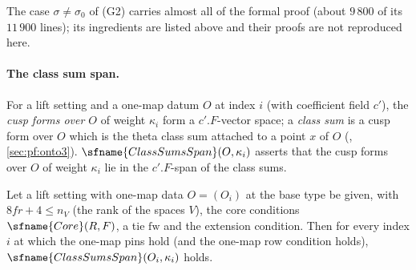 \begin{remark}\label{pf:sh-div:rem:conj}
The case $\sigma\ne\sigma_0$ of (G2) carries almost all of the formal proof (about $9\,800$ of its $11\,900$ lines); its ingredients are
listed above and their proofs are not reproduced here.
\end{remark}

\paragraph{The class sum span.} For a lift setting and a one-map datum $O$ at index $i$ (with coefficient field $c'$), the
\emph{cusp forms over $O$} of weight $\kappa_i$ form a $c'.F$-vector space; a \emph{class sum} is a cusp form over $O$ which is the
theta class sum attached to a point $x$ of $O$ (\cite{LeanSource2026}, \cref{sec:pf:onto3}). $\sfname{ClassSumsSpan}(O,\kappa_i)$ asserts
that the cusp forms over $O$ of weight $\kappa_i$ lie in the $c'.F$-span of the class sums.

\begin{theorem}\label{pf:sh-div:classsum}
Let a lift setting with one-map data $O=(O_i)$ at the base type be given, with $8fr+4\le n_V$ (the rank of the spaces $V$), the core
conditions $\sfname{Core}(R,F)$, a tie $\mathrm{fw}$ and the extension condition. Then for every index $i$ at which the one-map pins
hold (and the one-map row condition holds), $\sfname{ClassSumsSpan}(O_i,\kappa_i)$ holds.
\end{theorem}

